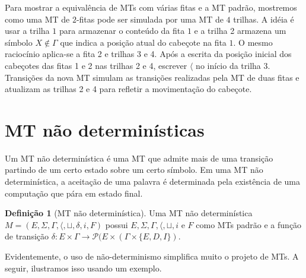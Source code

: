 \documentclass[a4paper]{article}
\theoremstyle{definition}
\newtheorem{Definition}{Definição}
\begin{document}
  Para mostrar a equivalência de MTs com várias fitas e a MT padrão, mostremos
  como uma MT de $2$-fitas pode ser simulada por uma MT de $4$ trilhas.
  A idéia é usar a trilha $1$ para armazenar o conteúdo da fita $1$ e a trilha 2
  armazena um símbolo $X \not\in \Gamma$ que indica a posição atual do cabeçote
  na fita $1$. O mesmo raciocínio aplica-se a fita 2 e trilhas 3 e 4. Após a
  escrita da posição inicial dos cabeçotes das fitas 1 e 2 nas trilhas 2 e 4,
  escrever $\langle$ no início da trilha 3. Transições da nova MT simulam
  as transições realizadas pela MT de duas fitas e atualizam as trilhas 2 e 4
  para refletir a movimentação do cabeçote.

  \section{MT não determinísticas}

  Um MT não determinística é uma MT que admite mais de uma transição partindo
  de um certo estado sobre um certo símbolo. Em uma MT não determinística,
  a aceitação de uma palavra é determinada pela existência de uma computação
  que pára em estado final.

 \begin{Definition}[MT não determinística]
    Uma MT não determinística $M = (E,\Sigma,\Gamma,\langle, \sqcup, \delta,i, F)$
    possui $E,\Sigma,\Gamma,\langle, \sqcup, i$ e $F$ como MTs padrão e a função
    de transição $\delta : E \times \Gamma \to \mathcal{P}(E \times (\Gamma \times \{E,D,I\})$.
  \end{Definition}

  Evidentemente, o uso de não-determinismo simplifica muito o projeto de MTs.
  A seguir, ilustramos isso usando um exemplo.
\end{document}
